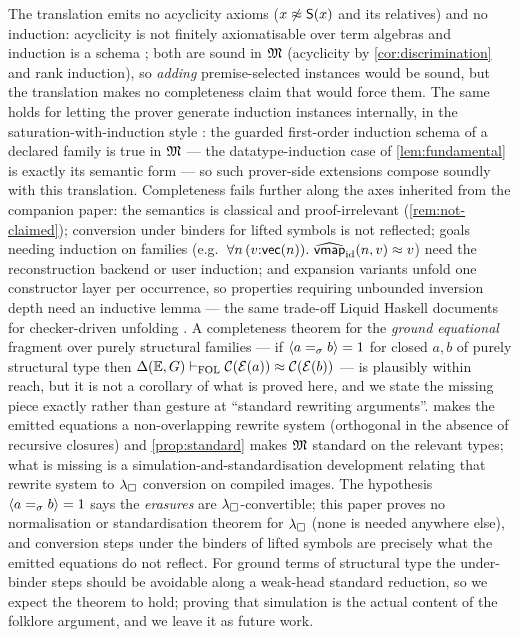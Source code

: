 The translation emits no acyclicity axioms ($x \not\approx \mathsf{S}(x)$ and
its relatives) and no induction: acyclicity is not finitely
axiomatisable over term algebras and induction is a schema
\cite{KovacsEtAl2017}; both are sound in $\mathfrak{M}$ (acyclicity by
\cref{cor:discrimination} and rank induction), so \emph{adding}
premise-selected instances would be sound, but the translation makes no
completeness claim that would force them.  The same holds for letting
the prover generate induction instances internally, in the
saturation-with-induction style
\cite{RegerVoronkov2019,HajduEtAl2022}: the guarded first-order
induction schema of a declared family is true in $\mathfrak{M}$ --- the
datatype-induction case of \cref{lem:fundamental} is exactly its
semantic form --- so such prover-side extensions compose soundly with
this translation.  Completeness fails further
along the axes inherited from the companion paper: the semantics is
classical and proof-irrelevant (\cref{rem:not-claimed}); conversion
under binders for lifted symbols is not reflected; goals needing
induction on families (e.g.\ $\forall n\,(v{:}\mathsf{vec}(n)).\
\widehat{\mathsf{vmap}}_{\mathrm{id}}(n,v) \approx v$) need the
reconstruction backend or user induction; and expansion variants
unfold one constructor layer per occurrence, so properties requiring
unbounded inversion depth need an inductive lemma --- the same
trade-off Liquid Haskell documents for checker-driven unfolding
\cite{VazouEtAl2014}.  A completeness theorem for the \emph{ground
equational} fragment over purely structural families --- if $\langle a
=_\sigma b \rangle = 1$ for closed $a, b$ of purely structural type then
$\Delta(\mathbb{E},G) \vdash_{\mathrm{FOL}} \mathcal{C}(\mathcal{E}(a)) \approx \mathcal{C}(\mathcal{E}(b))$ --- is
plausibly within reach, but it is not a corollary of what is proved
here, and we state the missing piece exactly rather than gesture at
``standard rewriting arguments''.  \Cref{rem:eq-shape} makes the
emitted equations a non-overlapping rewrite system (orthogonal in the
absence of recursive closures) and \cref{prop:standard}
makes $\mathfrak{M}$ standard on the relevant types; what is missing is a
simulation-and-standardisation development relating that rewrite
system to $\lambda_{\square}$ conversion on compiled images.  The hypothesis
$\langle a =_\sigma b \rangle = 1$ says the \emph{erasures} are
$\lambda_{\square}$-convertible; this paper proves no normalisation or
standardisation theorem for $\lambda_{\square}$ (none is needed anywhere else),
and conversion steps under the binders of lifted symbols are precisely
what the emitted equations do not reflect.  For ground terms of
structural type the under-binder steps should be avoidable along a
weak-head standard reduction, so we expect the theorem to hold; proving
that simulation is the actual content of the folklore argument, and we
leave it as future work.

